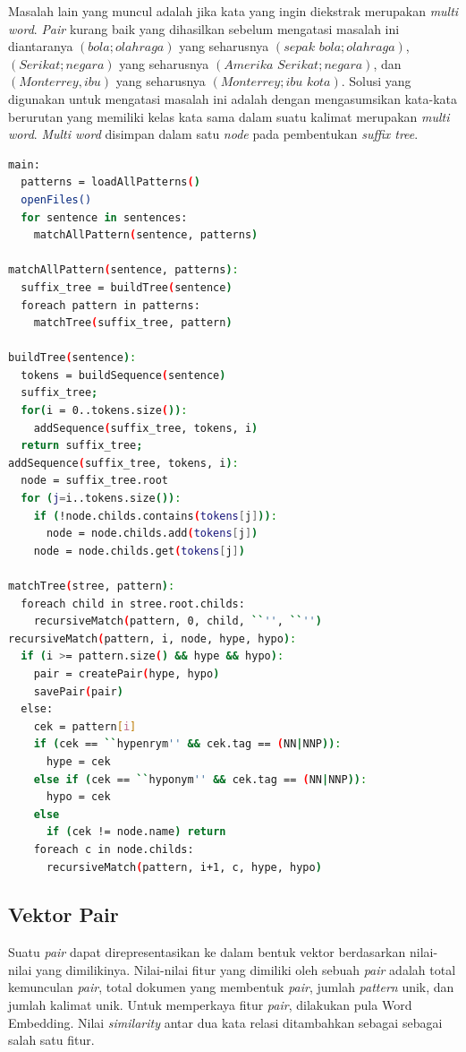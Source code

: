 Masalah lain yang muncul adalah jika kata yang ingin diekstrak merupakan \textit{multi word}. \textit{Pair} kurang baik yang dihasilkan sebelum mengatasi masalah ini diantaranya $(bola;olahraga)$ yang seharusnya $(sepak\,\,bola;olahraga)$, $(Serikat;negara)$ yang seharusnya $(Amerika\,\,Serikat;negara)$, dan $(Monterrey,ibu)$ yang seharusnya $(Monterrey;ibu\,\,kota)$. Solusi yang digunakan untuk mengatasi masalah ini adalah dengan mengasumsikan kata-kata berurutan yang memiliki kelas kata sama dalam suatu kalimat merupakan \textit{multi word}. \textit{Multi word} disimpan dalam satu \textit{node} pada pembentukan \textit{suffix tree}.
\begin{lstlisting}[caption={Algoritme ekstraksi \textit{pair}}, language=bash]
main:
  patterns = loadAllPatterns()
  openFiles()
  for sentence in sentences:
    matchAllPattern(sentence, patterns)

matchAllPattern(sentence, patterns):
  suffix_tree = buildTree(sentence)
  foreach pattern in patterns:
    matchTree(suffix_tree, pattern)
  
buildTree(sentence):
  tokens = buildSequence(sentence)
  suffix_tree;
  for(i = 0..tokens.size()):
    addSequence(suffix_tree, tokens, i)
  return suffix_tree;
addSequence(suffix_tree, tokens, i):
  node = suffix_tree.root
  for (j=i..tokens.size()):
    if (!node.childs.contains(tokens[j])):
      node = node.childs.add(tokens[j])
    node = node.childs.get(tokens[j])

matchTree(stree, pattern):
  foreach child in stree.root.childs:
    recursiveMatch(pattern, 0, child, ``'', ``'')
recursiveMatch(pattern, i, node, hype, hypo):
  if (i >= pattern.size() && hype && hypo):
    pair = createPair(hype, hypo)
    savePair(pair)
  else:
    cek = pattern[i]
    if (cek == ``hypenrym'' && cek.tag == (NN|NNP)):
      hype = cek
    else if (cek == ``hyponym'' && cek.tag == (NN|NNP)):
      hypo = cek
    else 
      if (cek != node.name) return
    foreach c in node.childs:
      recursiveMatch(pattern, i+1, c, hype, hypo)
\end{lstlisting}


\subsection{Vektor Pair}
Suatu \textit{pair} dapat direpresentasikan ke dalam bentuk vektor berdasarkan nilai-nilai yang dimilikinya. Nilai-nilai fitur yang dimiliki oleh sebuah \textit{pair} adalah total kemunculan \textit{pair}, total dokumen yang membentuk \textit{pair}, jumlah \textit{pattern} unik, dan jumlah kalimat unik. Untuk memperkaya fitur \textit{pair}, dilakukan pula Word Embedding. Nilai \textit{similarity} antar dua kata relasi ditambahkan sebagai sebagai salah satu fitur.

